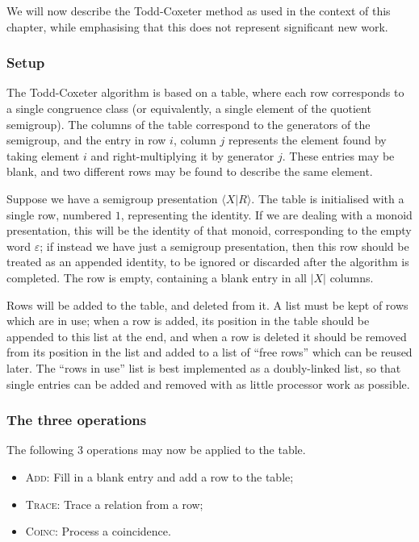 We will now describe the Todd-Coxeter method as used in the context of this
chapter, while emphasising that this does not represent significant new work.

\subsubsection{Setup}

The Todd-Coxeter algorithm is based on a table, where each row corresponds to a
single congruence class (or equivalently, a single element of the quotient
semigroup).  The columns of the table correspond to the generators of the
semigroup, and the entry in row $i$, column $j$ represents the element found by
taking element $i$ and right-multiplying it by generator $j$.  These entries may
be blank, and two different rows may be found to describe the same element.

Suppose we have a semigroup presentation $\langle X | R \rangle$.  The table is
initialised with a single row, numbered $1$, representing the identity.  If we
are dealing with a monoid presentation, this will be the identity of that
monoid, corresponding to the empty word $\varepsilon$; if instead we have just a
semigroup presentation, then this row should be treated as an appended identity,
to be ignored or discarded after the algorithm is completed.  The row is empty,
containing a blank entry in all $|X|$ columns.

Rows will be added to the table, and deleted from it.  A list must be kept of
rows which are in use; when a row is added, its position in the table should be
appended to this list at the end, and when a row is deleted it should be removed
from its position in the list and added to a list of ``free rows'' which can be
reused later.  The ``rows in use'' list is best implemented as a doubly-linked
list, so that single entries can be added and removed with as little processor
work as possible.

\subsubsection{The three operations}

The following 3 operations may now be applied to the table.

\begin{itemize}
\item \textsc{Add}: Fill in a blank entry and add a row to the table;
\item \textsc{Trace}: Trace a relation from a row;
\item \textsc{Coinc}: Process a coincidence.
\end{itemize}

